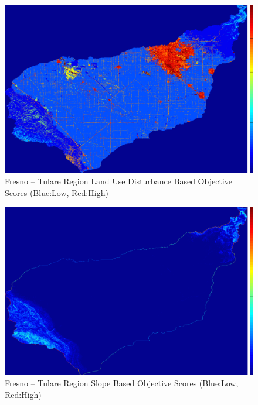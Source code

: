         \begin{figure}[!h]
            \begin{center}
            \includegraphics[width=5.5in]{figures/Fresno_DisturbanceScore.png}   
            \caption{Fresno -- Tulare Region Land Use Disturbance Based Objective Scores (Blue:Low, Red:High)}
            \label{fig:Fdisturbance}
            \end{center}
        \end{figure}
        
        \begin{figure}[!h]
            \begin{center}
            \includegraphics[width=5.5in]{figures/Fresno_SlopeScore.png}   
            \caption{Fresno -- Tulare Region Slope Based Objective Scores (Blue:Low, Red:High)}
            \label{fig:Fslope}
            \end{center}
        \end{figure}
        
